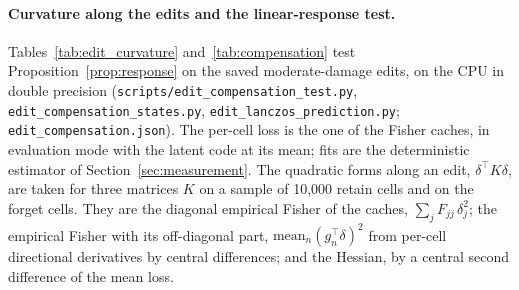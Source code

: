 \documentclass{article}
\begin{document}
\begin{table}[h]
\centering
\caption{The share of each edit still in the parameters after the fine-tune, $\rho = \langle \theta - \theta_{\mathrm{base}}, \delta\rangle / \|\delta\|^2$ with the no-edit fine-tune's own projection at the same epoch subtracted, overall and on the retain-null and retain-active coordinates. Beside it, the proposition's prediction for $\rho$ under gradient descent from the edit itself and the retain Fisher, $\sum_j \delta_j^2 (1 - \eta F^{\mathcal{R}}_j)^T / \sum_j \delta_j^2$, and the forget fit of the edited and of the no-edit fine-tune at 200 epochs. A negative $\rho$ is a fine-tune that has moved past the baseline along the edit's direction. A dash marks a quantity the row does not have, since an edit confined to one set of coordinates has no share on the other and the proposition predicts $\rho$ for gradient descent only. Generated from \texttt{restricted\_scrub\_test.json}.}
\label{tab:restricted_rho}
\small
\resizebox{\textwidth}{!}{}
\end{table}

\paragraph{Curvature along the edits and the linear-response test.} Tables~\ref{tab:edit_curvature} and~\ref{tab:compensation} test Proposition~\ref{prop:response} on the saved moderate-damage edits, on the CPU in double precision (\texttt{scripts/edit\_compensation\_test.py}, \texttt{edit\_compensation\_states.py}, \texttt{edit\_lanczos\_prediction.py}; \texttt{edit\_compensation.json}). The per-cell loss is the one of the Fisher caches, in evaluation mode with the latent code at its mean; fits are the deterministic estimator of Section~\ref{sec:measurement}. The quadratic forms along an edit, $\delta^\top K \delta$, are taken for three matrices $K$ on a sample of 10,000 retain cells and on the forget cells. They are the diagonal empirical Fisher of the caches, $\sum_j F_{jj}\,\delta_j^2$; the empirical Fisher with its off-diagonal part, $\mathrm{mean}_n (g_n^\top \delta)^2$ from per-cell directional derivatives by central differences; and the Hessian, by a central second difference of the mean loss.
\end{document}
